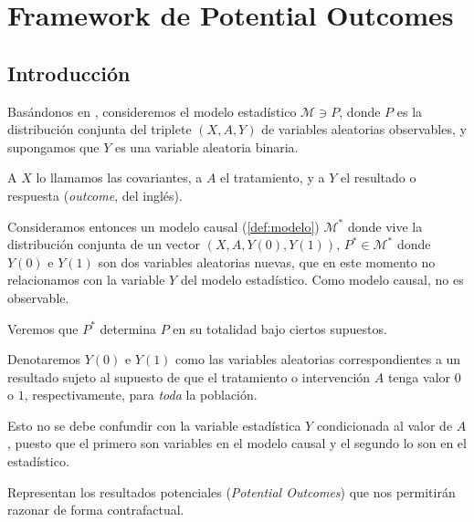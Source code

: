 \chapter{Framework de Potential Outcomes}

\section{Introducción}
Basándonos en \cite[capítulo 2]{targetedLearning}, consideremos el modelo estadístico $\mathcal{M} \ni P$,
donde $P$ es la distribución conjunta del triplete $(X, A, Y)$
de variables aleatorias observables, y supongamos que $Y$ es una variable aleatoria binaria.

A $X$ lo llamamos las covariantes, a $A$ el tratamiento, y a $Y$ el resultado o respuesta (\textit{outcome}, del inglés).

Consideramos entonces un modelo causal (\autoref{def:modelo}) $\mathcal{M}^*$
donde vive la distribución conjunta de un vector $(X, A, Y(0), Y(1))$,
$P^* \in \mathcal{M}^*$ donde $Y(0)$ e $Y(1)$ son dos variables aleatorias nuevas,
que en este momento no relacionamos con la variable $Y$ del modelo estadístico.
Como modelo causal, no es observable.

Veremos que $P^*$ determina $P$ en su totalidad bajo ciertos supuestos.

\begin{notac}
    Denotaremos $Y(0)$ e $Y(1)$ como las variables aleatorias correspondientes a un resultado
    sujeto al supuesto de que el tratamiento o intervención $A$ tenga valor $0$ o $1$,
    respectivamente, para \emph{toda} la población.

    Esto no se debe confundir con la variable estadística $Y$ condicionada al valor de $A$,
    puesto que el primero son variables en el modelo causal y el segundo lo son en el estadístico.

    Representan los resultados potenciales (\textit{Potential Outcomes}) que nos permitirán
    razonar de forma contrafactual.
\end{notac}


